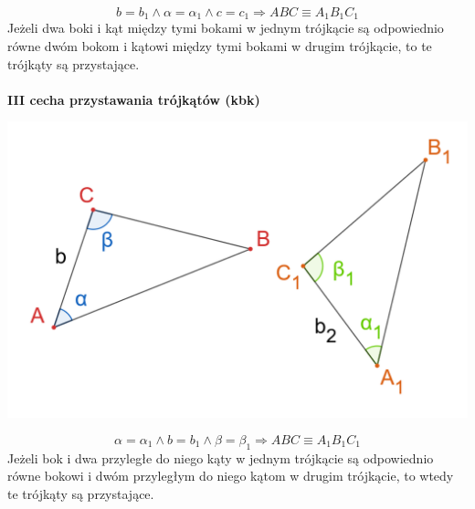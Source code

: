 \documentclass[14pt,a4paper]{extarticle}
\begin{document}
$$b=b_{1}\land \alpha = \alpha_{1} \land c=c_{1} \Rightarrow ABC \equiv A_{1}B_{1}C_{1}$$
Jeżeli dwa boki i kąt między tymi bokami w jednym trójkącie są odpowiednio równe dwóm bokom i kątowi
między tymi bokami w drugim trójkącie, to te trójkąty są przystające.\\\\
\noindent \textbf{III cecha przystawania trójkątów (kbk)}
\begin{center}\includegraphics[scale=0.45]{geometria/przystawanie kbk.png}\end{center}
$$\alpha = \alpha_{1}\land b=b_{1}\land \beta=\beta_{1} \Rightarrow ABC \equiv A_{1}B_{1}C_{1}$$
Jeżeli bok i dwa przyległe do niego kąty w jednym trójkącie są odpowiednio równe bokowi i dwóm
przyległym do niego kątom w drugim trójkącie, to wtedy te trójkąty są przystające.

\newpage
\end{document}

